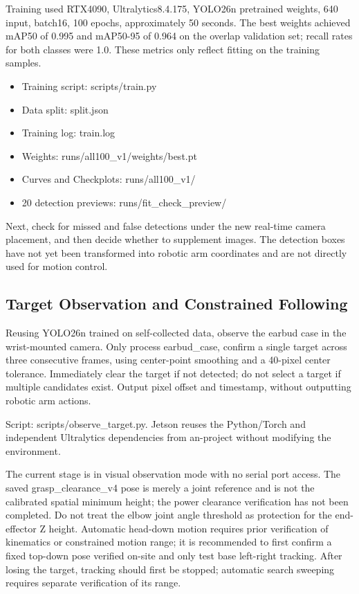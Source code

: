 Training used RTX4090, Ultralytics8.4.175, YOLO26n pretrained weights, 640 input, batch16, 100 epochs, approximately 50 seconds. The best weights achieved mAP50 of 0.995 and mAP50-95 of 0.964 on the overlap validation set; recall rates for both classes were 1.0. These metrics only reflect fitting on the training samples.

\begin{itemize}
\tightlist
\item
  Training script: scripts/train.py
\item
  Data split: split.json
\item
  Training log: train.log
\item
  Weights: runs/all100\_v1/weights/best.pt
\item
  Curves and Checkplots: runs/all100\_v1/
\item
  20 detection previews: runs/fit\_check\_preview/
\end{itemize}

Next, check for missed and false detections under the new real-time camera placement, and then decide whether to supplement images. The detection boxes have not yet been transformed into robotic arm coordinates and are not directly used for motion control.


\subsection{Target Observation and Constrained Following}\label{s06-detail-8}

Reusing YOLO26n trained on self-collected data, observe the earbud case in the wrist-mounted camera. Only process earbud\_case, confirm a single target across three consecutive frames, using center-point smoothing and a 40-pixel center tolerance. Immediately clear the target if not detected; do not select a target if multiple candidates exist. Output pixel offset and timestamp, without outputting robotic arm actions.

Script: scripts/observe\_target.py. Jetson reuses the Python/Torch and independent Ultralytics dependencies from an-project without modifying the environment.

The current stage is in visual observation mode with no serial port access. The saved grasp\_clearance\_v4 pose is merely a joint reference and is not the calibrated spatial minimum height; the power clearance verification has not been completed. Do not treat the elbow joint angle threshold as protection for the end-effector Z height. Automatic head-down motion requires prior verification of kinematics or constrained motion range; it is recommended to first confirm a fixed top-down pose verified on-site and only test base left-right tracking. After losing the target, tracking should first be stopped; automatic search sweeping requires separate verification of its range.


